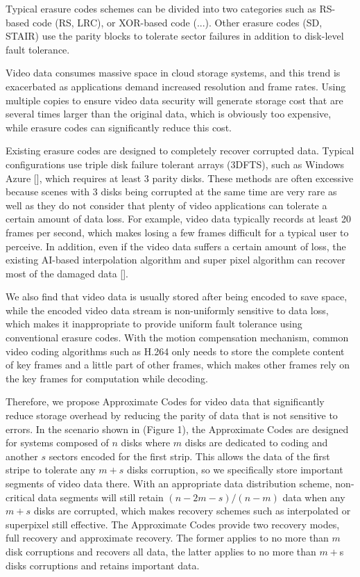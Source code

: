 \documentclass[sigconf]{acmart}
\begin{document}
Typical erasure codes schemes can be divided into two categories such as RS-based code (RS, LRC), or XOR-based code (...). Other erasure codes (SD, STAIR) use the parity blocks to tolerate sector failures in addition to disk-level fault tolerance.

Video data consumes massive space in cloud storage systems, and this trend is exacerbated as applications demand increased resolution and frame rates. Using multiple copies to ensure video data security will generate storage cost that are several times larger than the original data, which is obviously too expensive, while erasure codes can significantly reduce this cost.

Existing erasure codes are designed to completely recover corrupted data. Typical configurations use triple disk failure tolerant arrays (3DFTS), such as Windows Azure [], which requires at least 3 parity disks. These methods are often excessive because scenes with 3 disks being corrupted at the same time are very rare as well as they do not consider that plenty of video applications can tolerate a certain amount of data loss. For example, video data typically records at least 20 frames per second, which makes losing a few frames difficult for a typical user to perceive. In addition, even if the video data suffers a certain amount of loss, the existing AI-based interpolation algorithm and super pixel algorithm can recover most of the damaged data [].

We also find that video data is usually stored after being encoded to save space, while the encoded video data stream is non-uniformly sensitive to data loss, which makes it inappropriate to provide uniform fault tolerance using conventional erasure codes. With the motion compensation mechanism, common video coding algorithms such as H.264 only needs to store the complete content of key frames and a little part of other frames, which makes other frames rely on the key frames for computation while decoding.

Therefore, we propose Approximate Codes for video data that significantly reduce storage overhead by reducing the parity of data that is not sensitive to errors. In the scenario shown in (Figure 1), the Approximate Codes are designed for systems composed of $n$ disks where $m$ disks are dedicated to coding and another $s$ sectors encoded for the first strip. This allows the data of the first stripe to tolerate any $m+s$ disks corruption, so we specifically store important segments of video data there. With an appropriate data distribution scheme, non-critical data segments will still retain $(n-2m-s)/(n-m)$ data when any $m+s$ disks are corrupted, which makes
recovery schemes such as interpolated or superpixel still effective. The Approximate Codes provide two recovery modes, full recovery and approximate recovery. The former applies to no more than $m$ disk corruptions and recovers all data, the latter applies to no more than $m+$s disks corruptions and retains important data.
\end{document}
